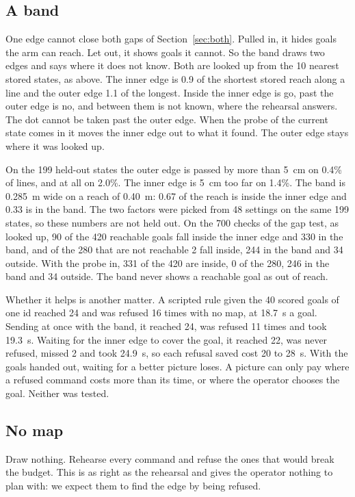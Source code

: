 \documentclass[pdflatex,sn-mathphys-num]{sn-jnl}
\begin{document}
\subsection{A band}\label{sec:band}
One edge cannot close both gaps of Section~\ref{sec:both}. Pulled in, it hides goals the arm can reach. Let out, it
shows goals it cannot. So the band draws two edges and says where it does not know. Both are looked up from the 10
nearest stored states, as above. The inner edge is 0.9 of the shortest stored reach along a line and the outer
edge 1.1 of the longest. Inside the inner edge is go, past the outer edge is no, and between them is not known, where
the rehearsal answers. The dot cannot be taken past the outer edge. When the probe of the current state comes in it
moves the inner edge out to what it found. The outer edge stays where it was looked up.

On the 199 held-out states the outer edge is passed by more than 5~cm on 0.4\% of lines, and at all on 2.0\%. The
inner edge is 5~cm too far on 1.4\%. The band is 0.285~m wide on a reach of 0.40~m: 0.67 of the reach is inside the
inner edge and 0.33 is in the band. The two factors were picked from 48 settings on the same 199 states, so these
numbers are not held out. %
On the 700 checks of the gap test, as looked up, 90 of the 420 reachable goals fall inside the inner edge and 330 in
the band, and of the 280 that are not reachable 2 fall inside, 244 in the band and 34 outside. With the probe in,
331 of the 420 are inside, 0 of the 280, 246 in the band and 34 outside. The band never shows a reachable goal as
out of reach. %

Whether it helps is another matter. A scripted rule given the 40 scored goals of one id reached 24 and was refused
16 times with no map, at 18.7~s a goal. Sending at once with the band, it reached 24, was refused 11 times and took
19.3~s. Waiting for the inner edge to cover the goal, it reached 22, was never refused, missed 2 and took 24.9~s, so
each refusal saved cost 20 to 28~s. With the goals handed out, waiting for a better picture loses. A picture can
only pay where a refused command costs more than its time, or where the operator chooses the goal. Neither was
tested. %

\subsection{No map}
Draw nothing. Rehearse every command and refuse the ones that would break the budget. This is as right as the
rehearsal and gives the operator nothing to plan with: we expect them to find the edge by being refused.
\end{document}
